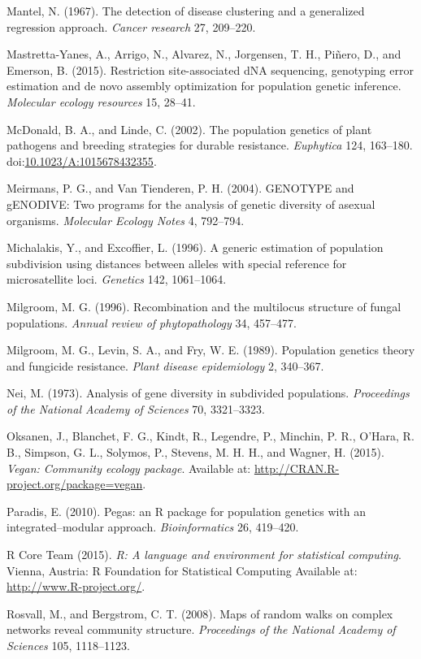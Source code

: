 \documentclass{frontiersSCNS} %
\begin{document}
Mantel, N. (1967). The detection of disease clustering and a generalized
regression approach. \emph{Cancer research} 27, 209--220.

Mastretta-Yanes, A., Arrigo, N., Alvarez, N., Jorgensen, T. H.,
Pi{ñ}ero, D., and Emerson, B. (2015). Restriction site-associated dNA
sequencing, genotyping error estimation and de novo assembly
optimization for population genetic inference. \emph{Molecular ecology
resources} 15, 28--41.

McDonald, B. A., and Linde, C. (2002). The population genetics of plant
pathogens and breeding strategies for durable resistance.
\emph{Euphytica} 124, 163--180.
doi:\href{http://dx.doi.org/10.1023/A:1015678432355}{10.1023/A:1015678432355}.

Meirmans, P. G., and Van Tienderen, P. H. (2004). GENOTYPE and gENODIVE:
Two programs for the analysis of genetic diversity of asexual organisms.
\emph{Molecular Ecology Notes} 4, 792--794.

Michalakis, Y., and Excoffier, L. (1996). A generic estimation of
population subdivision using distances between alleles with special
reference for microsatellite loci. \emph{Genetics} 142, 1061--1064.

Milgroom, M. G. (1996). Recombination and the multilocus structure of
fungal populations. \emph{Annual review of phytopathology} 34, 457--477.

Milgroom, M. G., Levin, S. A., and Fry, W. E. (1989). Population
genetics theory and fungicide resistance. \emph{Plant disease
epidemiology} 2, 340--367.

Nei, M. (1973). Analysis of gene diversity in subdivided populations.
\emph{Proceedings of the National Academy of Sciences} 70, 3321--3323.

Oksanen, J., Blanchet, F. G., Kindt, R., Legendre, P., Minchin, P. R.,
O'Hara, R. B., Simpson, G. L., Solymos, P., Stevens, M. H. H., and
Wagner, H. (2015). \emph{Vegan: Community ecology package}. Available
at: \url{http://CRAN.R-project.org/package=vegan}.

Paradis, E. (2010). Pegas: an R package for population genetics with an
integrated--modular approach. \emph{Bioinformatics} 26, 419--420.

R Core Team (2015). \emph{R: A language and environment for statistical
computing}. Vienna, Austria: R Foundation for Statistical Computing
Available at: \url{http://www.R-project.org/}.

Rosvall, M., and Bergstrom, C. T. (2008). Maps of random walks on
complex networks reveal community structure. \emph{Proceedings of the
National Academy of Sciences} 105, 1118--1123.
\end{document}
